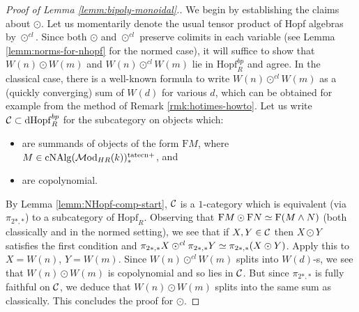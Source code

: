 \documentclass{amsart}
\numberwithin{proposition}{section}
\numberwithin{equation}{section}
\def\tate{\mathrm{tate}}
\def\Hopf{\mathrm{Hopf}}
\def\dHopf{\mathrm{dHopf}}
\def\Hopf{\mathrm{Hopf}}
\def\cNAlg{\mathrm{cNAlg}}
\def\cn{\mathrm{cn}}
\def\Free{\mathrm{F}}
\def\hotimes{\odot}
\begin{document}
\begin{proof}[Proof of Lemma \ref{lemm:bipoly-monoidal}.]
We begin by establishing the claims about $\hotimes$.
Let us momentarily denote the usual tensor product of Hopf algebras by $\hotimes^{cl}$.
Since both $\hotimes$ and $\hotimes^{cl}$ preserve colimits in each variable (see Lemma \ref{lemm:norms-for-nhopf} for the normed case), it will suffice to show that $W(n) \hotimes W(m)$ and $W(n) \hotimes^{cl} W(m)$ lie in $\Hopf_R^{bp}$ and agree.
In the classical case, there is a well-known formula to write $W(n) \hotimes^{cl} W(m)$ as a (quickly converging) sum of $W(d)$ for various $d$, which can be obtained for example from the method of Remark \ref{rmk:hotimes-howto}.
Let us write $\scr C \subset \dHopf_R^{bp}$ for the subcategory on objects which:
\begin{itemize}
\item are summands of objects of the form $\Free M$, where $M \in \cNAlg(\Mod_{HR}(k))^{\tate\cn+}_*$, and
\item are copolynomial.
\end{itemize}
By Lemma \ref{lemm:NHopf-comp-start}, $\mathcal C$ is a $1$-category which is equivalent (via $\pi_{2*,*}$) to a subcategory of $\Hopf_R$.
Observing that $\Free M \hotimes \Free N \wequi \Free(M \wedge N)$ (both classically and in the normed setting), we see that if $X, Y \in \mathcal C$ then $X \hotimes Y$ satisfies the first condition and $\pi_{2*,*}X \hotimes^{cl} \pi_{2*,*}Y \wequi \pi_{2*,*}(X \hotimes Y)$.
Apply this to $X=W(n)$, $Y=W(m)$.
Since $W(n) \hotimes^{cl} W(m)$ splits into $W(d)$-s, we see that $W(n) \hotimes W(m)$ is copolynomial and so lies in $\mathcal C$.
But since $\pi_{2*,*}$ is fully faithful on $\mathcal C$, we deduce that $W(n) \hotimes W(m)$ splits into the same sum as classically.
This concludes the proof for $\hotimes$.


\end{proof}
\end{document}
